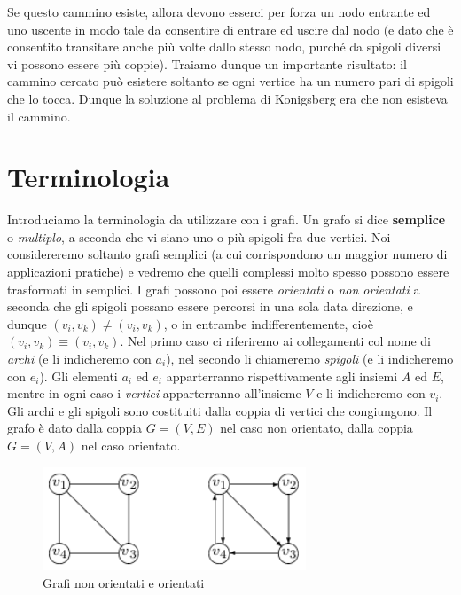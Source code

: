 \documentclass[11pt]{book}
\begin{document}
Se questo cammino esiste, allora devono esserci per forza un nodo
entrante ed uno uscente in modo tale da consentire di entrare ed
uscire dal nodo (e dato che \`e consentito transitare anche pi\`u
volte dallo stesso nodo, purch\'e da spigoli diversi vi possono essere
pi\`u coppie). Traiamo dunque un importante risultato: il cammino
cercato pu\`o esistere soltanto se ogni vertice ha un numero pari di
spigoli che lo tocca. Dunque la soluzione al problema di Konigsberg
era che non esisteva il cammino.

\section{Terminologia}

Introduciamo la terminologia da utilizzare con i grafi. Un grafo si
dice {\bf semplice} o {\em multiplo}, a seconda che vi siano uno o
pi\`u spigoli fra due vertici. Noi considereremo soltanto grafi
semplici (a cui corrispondono un maggior numero di applicazioni
pratiche) e vedremo che quelli complessi molto spesso possono essere
trasformati in semplici.  I grafi possono poi essere {\em orientati}
o {\em non orientati} a seconda che gli spigoli possano essere
percorsi in una sola data direzione, e dunque $(v_i,v_k) \neq (v_i,
v_k)$, o in entrambe indifferentemente, cio\`e $(v_i,v_k) \equiv (v_i,
v_k)$. Nel primo caso ci riferiremo ai collegamenti col nome di {\em
  archi} (e li indicheremo con $a_i$), nel secondo li chiameremo {\em
  spigoli} (e li indicheremo con $e_i$). Gli elementi $a_i$ ed $e_i$
apparterranno rispettivamente agli insiemi $A$ ed $E$, mentre in ogni
caso i {\em vertici} apparterranno all'insieme $V$ e li indicheremo
con $v_i$. Gli archi e gli spigoli sono costituiti dalla coppia di
vertici che congiungono. Il grafo \`e dato dalla coppia $G=(V,E)$ nel
caso non orientato, dalla coppia $G=(V,A)$ nel caso orientato.

\begin{figure}[h!]
\centering
\includegraphics[width=0.7\textwidth]{images/cap7dirnondir.png}
\caption{Grafi non orientati e orientati}
\label{cap7dirnondir}
\end{figure}
\end{document}
